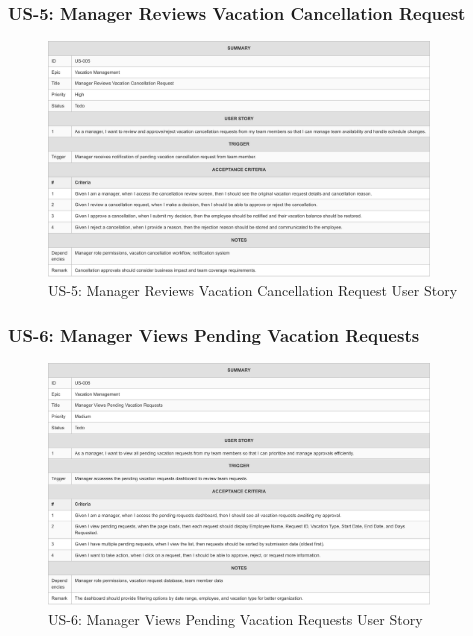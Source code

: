 \documentclass[12pt,a4paper]{article}
\begin{document}
\subsubsection{US-5: Manager Reviews Vacation Cancellation Request}
\begin{figure}[H]
\centering
\includegraphics[width=0.9\textwidth]{User-Stories/US-5-Manager-Reviews-Vacation-Cancellation-Request/US-5-Manager-Reviews-Vacation-Cancellation-Request-1.png}
\caption{US-5: Manager Reviews Vacation Cancellation Request User Story}
\label{fig:us5}
\end{figure}

\subsubsection{US-6: Manager Views Pending Vacation Requests}
\begin{figure}[H]
\centering
\includegraphics[width=0.9\textwidth]{User-Stories/US-6-Manager-Views-Pending-Vacation-Requests/US-6-Manager-Views-Pending-Vacation-Requests-1.png}
\caption{US-6: Manager Views Pending Vacation Requests User Story}
\label{fig:us6}
\end{figure}
\end{document}
